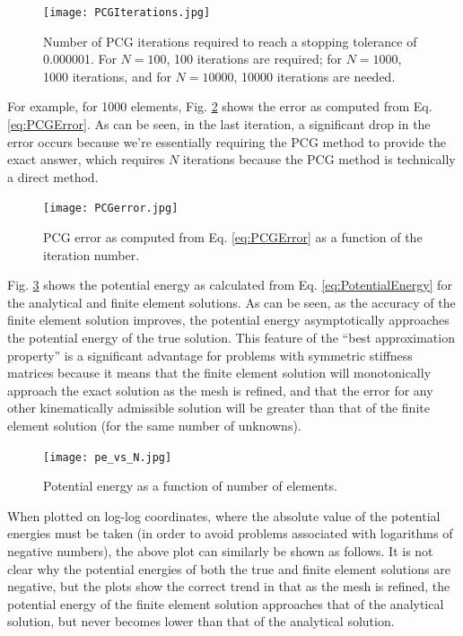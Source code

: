 \documentclass[10pt]{article}
\begin{document}
\begin{figure}[H]
  \centering
  \texttt{[image: PCGIterations.jpg]} %
  \caption{Number of PCG iterations required to reach a stopping tolerance of 0.000001. For \(N=100\), 100 iterations are required; for \(N=1000\), 1000 iterations, and for \(N=10000\), 10000 iterations are needed.}
  \label{fig:PCGIterations}
\end{figure}

For example, for 1000 elements, Fig. \ref{fig:PCGerror} shows the error as computed from Eq. \eqref{eq:PCGError}. As can be seen, in the last iteration, a significant drop in the error occurs because we're essentially requiring the PCG method to provide the exact answer, which requires \(N\) iterations because the PCG method is technically a direct method.

\begin{figure}[H]
  \centering
  \texttt{[image: PCGerror.jpg]} %
  \caption{PCG error as computed from Eq. \eqref{eq:PCGError} as a function of the iteration number.}
  \label{fig:PCGerror}
\end{figure}

Fig. \ref{fig:PotentialEnergy} shows the potential energy as calculated from Eq. \eqref{eq:PotentialEnergy} for the analytical and finite element solutions. As can be seen, as the accuracy of the finite element solution improves, the potential energy asymptotically approaches the potential energy of the true solution. This feature of the ``best approximation property'' is a significant advantage for problems with symmetric stiffness matrices because it means that the finite element solution will monotonically approach the exact solution as the mesh is refined, and that the error for any other kinematically admissible solution will be greater than that of the finite element solution (for the same number of unknowns).

\begin{figure}[H]
  \centering
  \texttt{[image: pe\_vs\_N.jpg]} %
  \caption{Potential energy as a function of number of elements. }
  \label{fig:PotentialEnergy}
\end{figure}

When plotted on log-log coordinates, where the absolute value of the potential energies must be taken (in order to avoid problems associated with logarithms of negative numbers), the above plot can similarly be shown as follows. It is not clear why the potential energies of both the true and finite element solutions are negative, but the plots show the correct trend in that as the mesh is refined, the potential energy of the finite element solution approaches that of the analytical solution, but never becomes lower than that of the analytical solution. 
\end{document}
